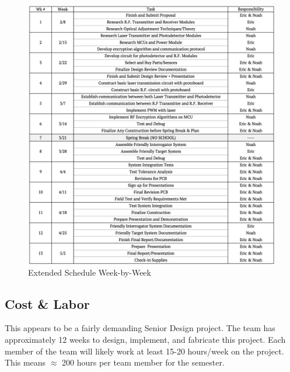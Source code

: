 \documentclass[openbib,letterpaper,10pt]{article}
\begin{document}
\begin{spacing}{1.15}
\begin{figure} [H]
	\centering
	\includegraphics[scale=0.65]{Schedule_Extended.png}
	\caption{Extended Schedule Week-by-Week\label{fig:schedule}}
\end{figure}


\subsection{Cost \& Labor}
This appears to be a fairly demanding Senior Design project. The team has approximately 12 weeks to design, implement, and fabricate this project. Each member of the team will likely work at least 15-20 hours/week on the project. This means $\approx$ 200 hours per team member for the semester. 


\end{spacing}
\end{document}
